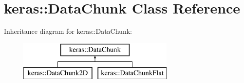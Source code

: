 \hypertarget{classkeras_1_1_data_chunk}{}\section{keras\+:\+:Data\+Chunk Class Reference}
\label{classkeras_1_1_data_chunk}
Inheritance diagram for keras\+:\+:Data\+Chunk\+:\begin{figure}[H]
\begin{center}
\leavevmode
\includegraphics[height=2.000000cm]{classkeras_1_1_data_chunk}
\end{center}
\end{figure}
